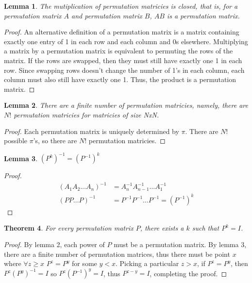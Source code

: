 \documentclass[11pt, oneside]{article}
\theoremstyle{plain}
\newtheorem{theorem}{Theorem}[section]
\newtheorem{lemma}[theorem]{Lemma}
\begin{document}
\newpage

\begin{lemma}
The mutiplication of permutation matricies is closed,
that is, for a permutation matrix \( A \) and permutation matrix \( B \),
\( AB \) is a permutation matrix.
\end{lemma}

\begin{proof}
An alternative definition of a permutation matrix is a matrix containing
exactly one entry of 1 in each row and each column and 0s elsewhere.
Multiplying a matrix by a permutation matrix is equivalent to
permuting the rows of the matrix. If the rows are swapped, then they
must still have exactly one 1 in each row. Since swapping rows doesn't
change the number of 1's in each column, each column must also still
have exactly one 1. Thus, the product is a permutation matrix.
\end{proof}

\begin{lemma}
There are a finite number of permutation matricies,
namely, there are \( N! \) permutation matricies for matricies of size NxN.
\end{lemma}

\begin{proof}
Each permutation matrix is uniquely determined by \( \pi \).
There are \( N! \) possible \( \pi \)'s, so there are \( N! \) permutation matricies.
\end{proof}

\begin{lemma}
\( (P^k)^{-1} = (P^{-1})^k \)
\end{lemma}

\begin{proof}
\begin{align*}
(A_1 A_2 \dots A_n)^{-1} &= A_n^{-1} A_{n - 1}^{-1} \dots A_1^{-1} \\
(P P \dots P)^{-1} &= P^{-1} P^{-1} \dots P^{-1} = (P^{-1})^k
\end{align*}
\end{proof}

\begin{theorem}
For every permutation matrix \( P \), there exists a \( k \) such that \( P^k = I \).
\end{theorem}

\begin{proof}
By lemma 2, each power of \( P \) must be a permutation matrix.
By lemma 3, there are a finite number of permutation matrices, thus
there must be point \( x \) where \( \forall z \geq x \) \( P^z = P^y \)
for some \( y < x \). Picking a particular \( z > x \), if \( P^z = P^y \), then \( P^z (P^y)^{-1} = I \)
so \( P^z (P^{-1})^y = I \), thus \( P^{z - y} = I \), completing the proof.
\end{proof}
\end{document}
